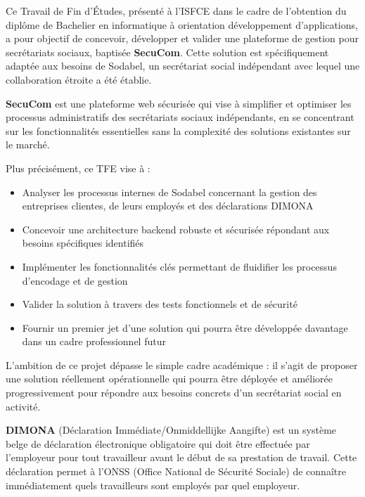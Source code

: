 Ce Travail de Fin d'Études, présenté à l'ISFCE dans le cadre de l'obtention du diplôme de Bachelier en informatique à orientation développement d'applications, a pour objectif de concevoir, développer et valider une plateforme de gestion pour secrétariats sociaux, baptisée \textbf{SecuCom}. Cette solution est spécifiquement adaptée aux besoins de Sodabel, un secrétariat social indépendant avec lequel une collaboration étroite a été établie.

\begin{infobox}
\textbf{SecuCom} est une plateforme web sécurisée qui vise à simplifier et optimiser les processus administratifs des secrétariats sociaux indépendants, en se concentrant sur les fonctionnalités essentielles sans la complexité des solutions existantes sur le marché.
\end{infobox}

Plus précisément, ce TFE vise à :
\begin{itemize}
  \item Analyser les processus internes de Sodabel concernant la gestion des entreprises clientes, de leurs employés et des déclarations DIMONA
  \item Concevoir une architecture backend robuste et sécurisée répondant aux besoins spécifiques identifiés
  \item Implémenter les fonctionnalités clés permettant de fluidifier les processus d'encodage et de gestion
  \item Valider la solution à travers des tests fonctionnels et de sécurité
  \item Fournir un premier jet d'une solution qui pourra être développée davantage dans un cadre professionnel futur
\end{itemize}

L'ambition de ce projet dépasse le simple cadre académique : il s'agit de proposer une solution réellement opérationnelle qui pourra être déployée et améliorée progressivement pour répondre aux besoins concrets d'un secrétariat social en activité.

\begin{definition}
\textbf{DIMONA} (Déclaration Immédiate/Onmiddellijke Aangifte) est un système belge de déclaration électronique obligatoire qui doit être effectuée par l'employeur pour tout travailleur avant le début de sa prestation de travail. Cette déclaration permet à l'ONSS (Office National de Sécurité Sociale) de connaître immédiatement quels travailleurs sont employés par quel employeur.
\end{definition}

